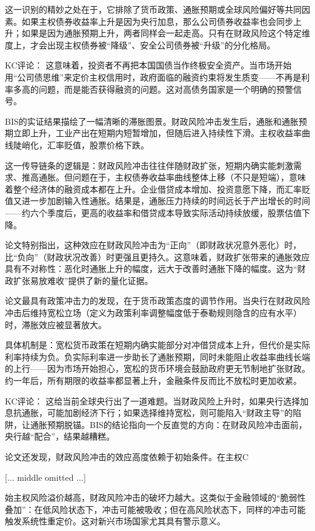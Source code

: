 \documentclass[11pt]{ctexart}
\begin{document}
这一识别的精妙之处在于，它排除了货币政策、通胀预期或全球风险偏好等共同因素。如果主权债券收益率上升是因为央行加息，那么公司债券收益率也会同步上升；如果是因为通胀预期上升，两者同样会一起走高。只有在财政风险这个特定维度上，才会出现主权债券被“降级”、安全公司债券被“升级”的分化格局。

KC评论： 这意味着，投资者不再把本国国债当作终极安全资产。当市场开始用“公司债思维”来定价主权信用时，政府面临的融资约束将发生质变——不再是利率多高的问题，而是能否获得融资的问题。这对高债务国家是一个明确的预警信号。

BIS的实证结果描绘了一幅清晰的滞胀图景。财政风险冲击发生后，通胀和通胀预期立即上升，工业产出在短期内短暂增加，但随后进入持续性下滑。主权收益率曲线陡峭化，汇率贬值，股票价格下跌。

这一传导链条的逻辑是：财政风险冲击往往伴随财政扩张，短期内确实能刺激需求、推高通胀。但问题在于，主权债券收益率曲线整体上移（不只是短端），意味着整个经济体的融资成本都在上升。企业借贷成本增加、投资意愿下降，而汇率贬值又进一步加剧输入性通胀。结果是，通胀压力持续的时间远长于产出增长的时间——约六个季度后，更高的收益率和借贷成本导致实际活动持续放缓，股票估值下降。

论文特别指出，这种效应在财政风险冲击为“正向”（即财政状况意外恶化）时，比“负向”（财政状况改善）时更强且更持久。这意味着，财政扩张带来的通胀效应具有不对称性：恶化时通胀上升的幅度，远大于改善时通胀下降的幅度。这为“财政扩张易放难收”提供了新的量化证据。

论文最具有政策冲击力的发现，在于货币政策态度的调节作用。当央行在财政风险冲击后维持宽松立场（定义为政策利率调整幅度低于泰勒规则隐含的应有水平）时，滞胀效应被显著放大。

具体机制是：宽松货币政策在短期内确实能部分对冲借贷成本上升，但代价是实际利率持续为负。负实际利率进一步助长了通胀预期，同时未能阻止收益率曲线长端的上行——因为市场开始担心，宽松的货币环境会鼓励政府更无节制地扩张财政。约一年后，所有期限的收益率都显著上升，金融条件反而比不放松时更加收紧。

KC评论： 这给当前全球央行出了一道难题。当财政风险上升时，如果央行选择加息抗通胀，可能加剧经济下行；如果选择维持宽松，则可能陷入“财政主导”的陷阱，让通胀预期脱锚。BIS的结论指向一个反直觉的方向：在财政风险冲击面前，央行越“配合”，结果越糟糕。

论文还发现，财政风险冲击的效应高度依赖于初始条件。在主权C

[... middle omitted ...]

始主权风险溢价越高，财政风险冲击的破坏力越大。这类似于金融领域的“脆弱性叠加”：在低风险状态下，冲击可能被吸收；但在高风险状态下，同样的冲击可能触发系统性重定价。这对新兴市场国家尤其具有警示意义。
\end{document}
